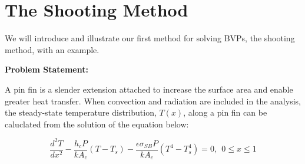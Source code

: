 \section{The Shooting Method}
We will introduce and illustrate our first method for solving BVPs, the shooting method, with an example.

\vspace{0.25cm}

\noindent\textbf{Problem Statement:}

\vspace{0.1cm}

\noindent A pin fin is a slender extension attached to increase the surface area and enable greater heat transfer.  When convection and radiation are included in the analysis, the steady-state temperature distribution, $T(x)$, along a pin fin can be caluclated from the solution of the equation below:

\begin{equation}
\frac{d^2T}{dx^2} - \frac{h_cP}{kA_c}\left(T - T_s\right)-\frac{\epsilon \sigma_{SB}P}{k A_c}\left(T^4 - T_s^4 \right) = 0, \ \ 0 \le x \le 1
\end{equation}

